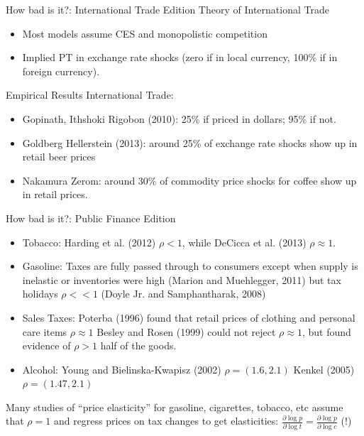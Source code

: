 \documentclass[aspectratio=169,10pt]{beamer}
\begin{document}
\begin{frame}{How bad is it?: International Trade Edition}
Theory of International Trade
\begin{itemize}
\item Most models assume CES and monopolistic competition
\item Implied PT in exchange rate shocks (zero if in local currency, 100\% if in foreign currency).
\end{itemize}

Empirical Results International Trade:
\begin{itemize}
\item Gopinath, Ithshoki Rigobon (2010): 25\% if priced in dollars; 95\% if not.
\item Goldberg Hellerstein (2013): around 25\% of exchange rate shocks show up in retail beer prices
\item Nakamura Zerom: around 30\% of commodity price shocks for coffee show up in retail prices.
\end{itemize}
\end{frame}

\begin{frame}{How bad is it?: Public Finance Edition}
\begin{itemize}
\item Tobacco: Harding et al. (2012) $\rho < 1$, while DeCicca et al. (2013) $\rho \approx 1$.
\item Gasoline: Taxes are fully passed through to consumers except when supply is inelastic or inventories were high (Marion and Muehlegger, 2011) but tax holidays $\rho << 1$ (Doyle Jr. and Samphantharak, 2008)
\item Sales Taxes: Poterba (1996) found that retail prices of clothing and personal care items $\rho \approx 1$ Besley and Rosen (1999) could not reject $\rho \approx 1$, but found evidence of $\rho >1$ half of the goods.
\item Alcohol:  Young and Bielinska-Kwapisz (2002) $\rho = (1.6,2.1)$ Kenkel (2005) $\rho=(1.47,2.1)$
\end{itemize}
Many studies of ``price elasticity'' for gasoline, cigarettes, tobacco, etc assume that $\rho=1$ and regress prices on tax changes to get elasticities: $\frac{\partial \log p}{\partial \log t} = \frac{\partial \log p}{\partial \log c}$ (!)
\end{frame}
\end{document}
